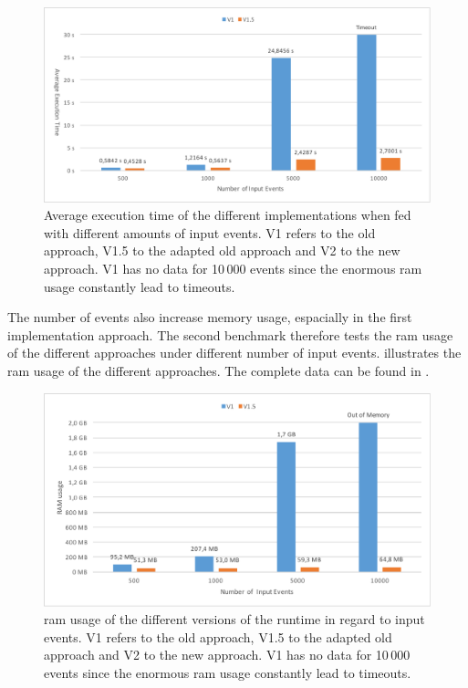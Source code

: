 \begin{figure}[!htb]
  \includegraphics[width=\textwidth]{gfx/runtime_num_events_benchmark}
  \caption[Average execution time of the different implementations when fed with different amounts of input events.]{Average execution time of the different implementations when fed with different amounts of input events. V1 refers to the old approach, V1.5 to the adapted old approach and V2 to the new approach. V1 has no data for 10\,000 events since the enormous \gls{ram} usage constantly lead to timeouts.}
\label{fig:chap_eval:runtime_num_events}
\end{figure}

The number of events also increase memory usage, espacially in the first implementation approach.
The second benchmark therefore tests the \gls{ram} usage of the different approaches under different number of input events.
 illustrates the \gls{ram} usage of the different approaches.
The complete data can be found in .

\begin{figure}[!htb]
  \includegraphics[width=\textwidth]{gfx/runtime_ram_usage_benchmark}
  \caption[\gls{ram} usage of the different versions of the runtime]{\gls{ram} usage of the different versions of the runtime in regard to input events. V1 refers to the old approach, V1.5 to the adapted old approach and V2 to the new approach. V1 has no data for 10\,000 events since the enormous \gls{ram} usage constantly lead to timeouts.}
\label{fig:chap_eval:runtime_ram_usage}
\end{figure}

